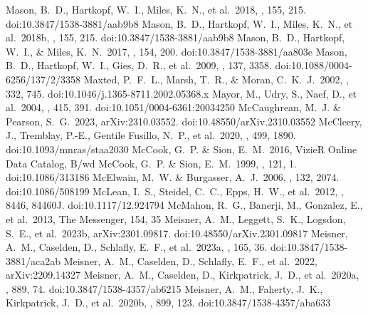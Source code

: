 \documentclass[twocolumn,tighten,twocolappendix]{aastex631}
\begin{document}
\begin{thebibliography}{}
 Mason, B.~D., Hartkopf, W.~I., Miles, K.~N., et al.\ 2018, \aj, 155, 215. doi:10.3847/1538-3881/aab9b8
{} Mason, B.~D., Hartkopf, W.~I., Miles, K.~N., et al.\ 2018b, \aj, 155, 215. doi:10.3847/1538-3881/aab9b8
 Mason, B.~D., Hartkopf, W.~I., \& Miles, K.~N.\ 2017, \aj, 154, 200. doi:10.3847/1538-3881/aa803e
 Mason, B.~D., Hartkopf, W.~I., Gies, D.~R., et al.\ 2009, \aj, 137, 3358. doi:10.1088/0004-6256/137/2/3358
 Maxted, P.~F.~L., Marsh, T.~R., \& Moran, C.~K.~J.\ 2002, \mnras, 332, 745. doi:10.1046/j.1365-8711.2002.05368.x
 Mayor, M., Udry, S., Naef, D., et al.\ 2004, \aap, 415, 391. doi:10.1051/0004-6361:20034250
 McCaughrean, M.~J. \& Pearson, S.~G.\ 2023, arXiv:2310.03552. doi:10.48550/arXiv.2310.03552
 McCleery, J., Tremblay, P.-E., Gentile Fusillo, N.~P., et al.\ 2020, \mnras, 499, 1890. doi:10.1093/mnras/staa2030
 McCook, G.~P. \& Sion, E.~M.\ 2016, VizieR Online Data Catalog, B/wd
 McCook, G.~P. \& Sion, E.~M.\ 1999, \apjs, 121, 1. doi:10.1086/313186
 McElwain, M.~W. \& Burgasser, A.~J.\ 2006, \aj, 132, 2074. doi:10.1086/508199
 McLean, I.~S., Steidel, C.~C., Epps, H.~W., et al.\ 2012, \procspie, 8446, 84460J. doi:10.1117/12.924794
 McMahon, R.~G., Banerji, M., Gonzalez, E., et al.\ 2013, The Messenger, 154, 35
 Meisner, A.~M., Leggett, S.~K., Logsdon, S.~E., et al.\ 2023b, arXiv:2301.09817. doi:10.48550/arXiv.2301.09817
 Meisner, A.~M., Caselden, D., Schlafly, E.~F., et al.\ 2023a, \aj, 165, 36. doi:10.3847/1538-3881/aca2ab
 Meisner, A.~M., Caselden, D., Schlafly, E.~F., et al.\ 2022, arXiv:2209.14327
 Meisner, A.~M., Caselden, D., Kirkpatrick, J.~D., et al.\ 2020a, \apj, 889, 74. doi:10.3847/1538-4357/ab6215
 Meisner, A.~M., Faherty, J.~K., Kirkpatrick, J.~D., et al.\ 2020b, \apj, 899, 123. doi:10.3847/1538-4357/aba633

\end{thebibliography}
\end{document}
